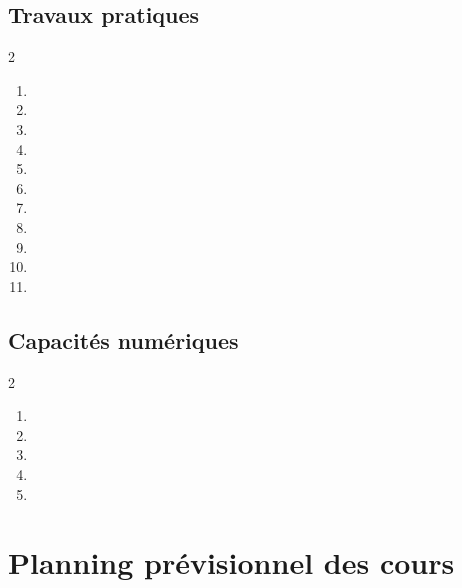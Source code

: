 \documentclass[12pt,fancy]{cours}
\begin{document}
\subsection{Travaux pratiques}
\begin{multicols}{2}
\begin{enumerate}[label=\small\color{coolblack}\faFlask]
      \item {}
      \item {}
      \item {}
      \item {}
      \item {}
      \item {}
      \item {}
      \item {}
      \item {}
      \item {}
      \item {}
\end{enumerate}
\end{multicols}

\subsection{Capacités numériques}

\begin{multicols}{2}
\begin{enumerate}[label=\small\color{coolblack}\faPython]
      \item {}
      \item {}
      \item {}
      \item {}
      \item {}
\end{enumerate}
\end{multicols}


\section{Planning prévisionnel des cours}
\end{document}
